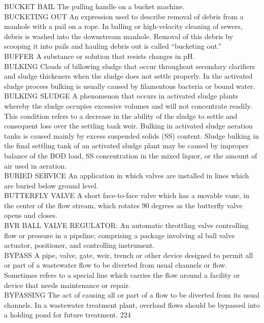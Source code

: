 BUCKET BAIL
The pulling handle on a bucket machine. 
\vspace{0.3cm}\\
BUCKETING OUT
An expression used to describe removal of debris from a manhole with a pail on a rope. In balling or high-velocity cleaning of sewers, debris is washed into the downstream manhole. Removal of this debris by scooping it into pails and hauling debris out is called “bucketing out.” 
\vspace{0.3cm}\\
BUFFER
A substance or solution that resists changes in pH. 
\vspace{0.3cm}\\
BULKING
Clouds of billowing sludge that occur throughout secondary clarifiers and sludge thickeners when the sludge does not settle properly.   In the activated sludge process bulking is usually caused by filamentous bacteria or bound water.
\vspace{0.3cm}\\
BULKING SLUDGE
A phenomenon that occurs in activated sludge plants whereby the sludge occupies excessive volumes and will not concentrate readily. This condition refers to a decrease in the ability of the sludge to settle and consequent loss over the settling tank weir. Bulking in activated sludge aeration tanks is caused mainly by excess suspended solids (SS) content. Sludge bulking in the final settling tank of an activated sludge plant may be caused by improper balance of the BOD load, SS concentration in the mixed liquor, or the amount of air used in aeration.
\vspace{0.3cm}\\
BURIED SERVICE
An application in which valves are installed in lines which are buried below ground level.
\vspace{0.3cm}\\
BUTTERFLY VALVE
A short face-to-face valve which has a movable vane, in the center of the flow stream, which rotates 90 degrees as the butterfly valve opens and closes.
\vspace{0.3cm}\\
BVR
BALL VALVE REGULATOR:  An automatic throttling valve controlling flow or pressure in a pipeline; comprising a package involving al ball valve actuator, positioner, and controlling instrument.
\vspace{0.3cm}\\
BYPASS
A pipe, valve, gate, weir, trench or other device designed to permit all or part of a wastewater flow to be diverted from usual channels or flow. Sometimes refers to a special line which carries the flow around a facility or device that needs maintenance or repair. 
\vspace{0.3cm}\\
BYPASSING
The act of causing all or part of a flow to be diverted from its usual channels. In a wastewater treatment plant, overload flows should be bypassed into a holding pond for future treatment. 224 
\vspace{0.3cm}\\

